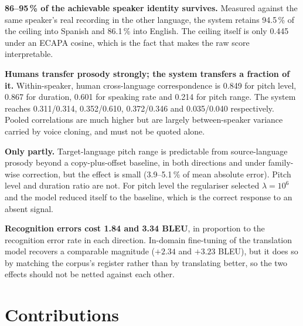 \begin{description}[leftmargin=3.2em, style=nextline]
\item[\textbf{RQ1}] \textbf{86--95\,\% of the achievable speaker identity survives.} Measured
      against the same speaker's real recording in the other language, the system retains 94.5\,\%
      of the ceiling into Spanish and 86.1\,\% into English. The ceiling itself is only 0.445 under
      an ECAPA cosine, which is the fact that makes the raw score interpretable.

\item[\textbf{RQ2}] \textbf{Humans transfer prosody strongly; the system transfers a fraction of
      it.} Within-speaker, human cross-language correspondence is 0.849 for pitch level, 0.867 for
      duration, 0.601 for speaking rate and 0.214 for pitch range. The system reaches 0.311/0.314,
      0.352/0.610, 0.372/0.346 and 0.035/0.040 respectively. Pooled correlations are much higher
      but are largely between-speaker variance carried by voice cloning, and must not be quoted
      alone.

\item[\textbf{RQ3}] \textbf{Only partly.} Target-language pitch range is predictable from
      source-language prosody beyond a copy-plus-offset baseline, in both directions and under
      family-wise correction, but the effect is small (3.9--5.1\,\% of mean absolute error). Pitch
      level and duration ratio are not. For pitch level the regulariser selected
      $\lambda = 10^{6}$ and the model reduced itself to the baseline, which is the correct
      response to an absent signal.

\item[\textbf{RQ4}] \textbf{Recognition errors cost 1.84 and 3.34 BLEU}, in proportion to the
      recognition error rate in each direction. In-domain fine-tuning of the translation model
      recovers a comparable magnitude ($+2.34$ and $+3.23$ BLEU), but it does so by matching the
      corpus's register rather than by translating better, so the two effects should not be netted
      against each other.
\end{description}

\section{Contributions}
\label{sec:final_contributions}

